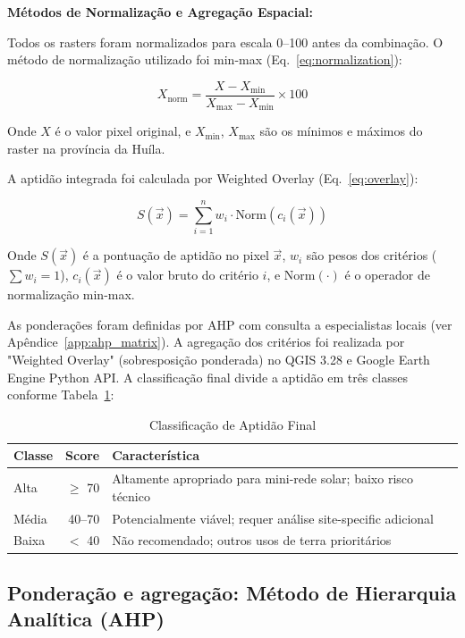 \documentclass[12pt, a4paper]{article}
\begin{document}
\noindent \textbf{Métodos de Normalização e Agregação Espacial:}

Todos os rasters foram normalizados para escala 0–100 antes da combinação. O método de normalização utilizado foi min-max (Eq.~\ref{eq:normalization}):

\begin{equation}
\label{eq:normalization}
X_{\text{norm}} = \frac{X - X_{\min}}{X_{\max} - X_{\min}} \times 100
\end{equation}

Onde $X$ é o valor pixel original, e $X_{\min}$, $X_{\max}$ são os mínimos e máximos do raster na província da Huíla.

A aptidão integrada foi calculada por Weighted Overlay (Eq.~\ref{eq:overlay}):

\begin{equation}
\label{eq:overlay}
S(\vec{x}) = \sum_{i=1}^{n} w_i \cdot \text{Norm}(c_{i}(\vec{x}))
\end{equation}

Onde $S(\vec{x})$ é a pontuação de aptidão no pixel $\vec{x}$, $w_i$ são pesos dos critérios ($\sum w_i = 1$), $c_i(\vec{x})$ é o valor bruto do critério $i$, e $\text{Norm}(\cdot)$ é o operador de normalização min-max.

As ponderações foram definidas por AHP com consulta a especialistas locais (ver Apêndice~\ref{app:ahp_matrix}). A agregação dos critérios foi realizada por "Weighted Overlay" (sobresposição ponderada) no QGIS 3.28 e Google Earth Engine Python API. A classificação final divide a aptidão em três classes conforme Tabela~\ref{tab:aptitude_classes}:

\begin{table}[H]
\centering
\caption{Classificação de Aptidão Final}
\label{tab:aptitude_classes}
\begin{tabular}{|l|r|l|}
\hline
\textbf{Classe} & \textbf{Score} & \textbf{Característica} \\
\hline
Alta & $\geq$ 70 & Altamente apropriado para mini-rede solar; baixo risco técnico \\
Média & 40–70 & Potencialmente viável; requer análise site-specific adicional \\
Baixa & $<$ 40 & Não recomendado; outros usos de terra prioritários \\
\hline
\end{tabular}
\end{table}

\subsection{Ponderação e agregação: Método de Hierarquia Analítica (AHP)}
\end{document}
